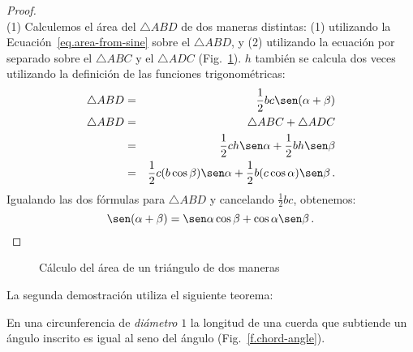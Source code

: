 \begin{proof}
\mbox{}\\
(1)
Calculemos el área del $\triangle ABD$ de dos maneras distintas: (1) utilizando la Ecuación~\ref{eq.area-from-sine} sobre el $\triangle ABD$, y (2) utilizando la ecuación por separado sobre el $\triangle ABC$ y el $\triangle ADC$ (Fig.~\ref{f.sin-sum2}).
$h$ también se calcula dos veces utilizando la definición de las funciones trigonométricas:
\begin{eqnarray*}
\triangle ABD &=& \frac{1}{2}bc\sen(\alpha+\beta)\\
\triangle ABD &=& \triangle ABC+\triangle ADC\\
&=& \frac{1}{2}ch\sen \alpha + \frac{1}{2}bh\sen \beta\\
&=& \frac{1}{2}c(b\cos\beta)\sen \alpha + \frac{1}{2}b(c\cos\alpha)\sen \beta\,.
\end{eqnarray*}
Igualando las dos fórmulas para $\triangle ABD$ y cancelando $\frac{1}{2}bc$, obtenemos:
\[
\sen(\alpha+\beta)=\sen\alpha\cos\beta+\cos \alpha\sen\beta\,.
\]
\end{proof}

\begin{figure}[tb]
\begin{center}
\end{center}
\caption{Cálculo del área de un triángulo de dos maneras}\label{f.sin-sum2}
\end{figure}

La segunda demostración utiliza el siguiente teorema:
\begin{theorem}
En una circunferencia de \emph{diámetro} $1$ la longitud de una cuerda que subtiende un ángulo inscrito es igual al seno del ángulo (Fig.~\ref{f.chord-angle}).
\end{theorem}

